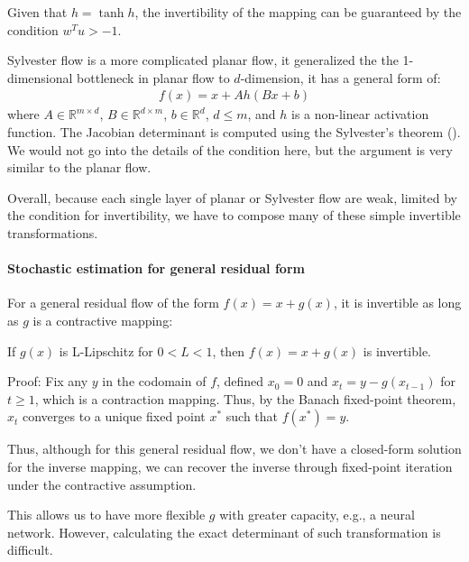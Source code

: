 \documentclass{mytufte-light}
\begin{document}
Given that \( h = \tanh h \), 
the invertibility of the mapping can be guaranteed by the condition \( w^T u > -1 \).

Sylvester flow is a more complicated planar flow, it 
generalized the the 1-dimensional bottleneck in planar flow
to \( d \)-dimension, it has a general form of:
\begin{align}
    f(x) = x + A h(B x + b)
\end{align}
where \( A \in \mathbb{R}^{m \times d} \), \( B \in \mathbb{R}^{d \times m} \), 
\( b \in \mathbb{R}^d \), \( d\leq m \), and \( h \) is a non-linear activation function.
The Jacobian determinant is computed using the Sylvester's theorem 
(\href{https://en.wikipedia.org/wiki/Sylvester%27s_determinant_theorem}{\color{blue}{Wiki}}).
We would not go into the details of the condition here, but the argument is
very similar to the planar flow.

Overall, because each single layer of planar or Sylvester flow 
are weak, limited by the condition for invertibility, 
we have to compose many of these simple invertible transformations.

\paragraph{Stochastic estimation for general residual form}
For a general residual flow of the form \( f(x) = x + g(x) \),
it is invertible as long as \( g \) is a contractive mapping:
\begin{Theorem}
    If \( g(x) \) is L-Lipschitz for \(0<L < 1\), then \( f(x) = x + g(x) \) is invertible.
\end{Theorem}
Proof: Fix any \( y \) in the codomain of \( f \), 
defined \( x_0=0 \) and \( x_{t} = y - g(x_{t-1}) \) for \( t \geq 1 \),
which is a contraction mapping. Thus, by the Banach fixed-point theorem,
\( x_t \) converges to a unique fixed point \( x^* \) such that \( f(x^*) = y \).

Thus, although for this general residual flow, we don't have a closed-form solution for the inverse mapping,
we can recover the inverse through fixed-point iteration under the contractive assumption.

This allows us to have more flexible \( g \) with greater capacity, 
e.g., a neural network. However, calculating
the exact determinant of such transformation is difficult.
\end{document}
